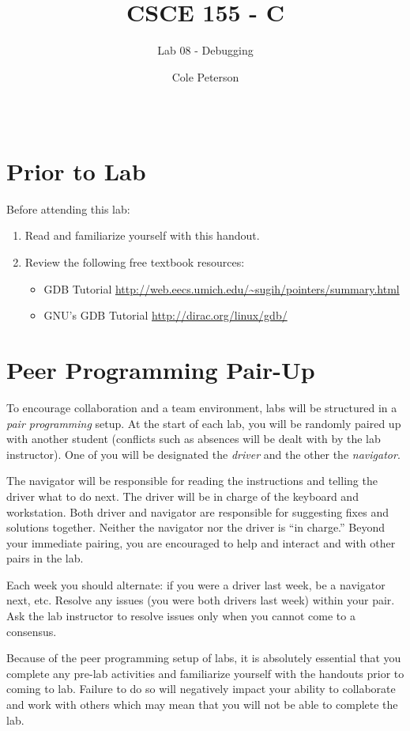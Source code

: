 \documentclass[12pt]{scrartcl}
\title{CSCE 155 - C}
\subtitle{Lab 08 - Debugging}
\author{Cole Peterson}
\date{~}
\begin{document}
\maketitle

\section*{Prior to Lab}

Before attending this lab:
\begin{enumerate}
  \item Read and familiarize yourself with this handout.
  \item Review the following free textbook resources:
	\begin{itemize}
  	  \item GDB Tutorial \url{http://web.eecs.umich.edu/~sugih/pointers/summary.html} 
	  \item GNU's GDB Tutorial \url{http://dirac.org/linux/gdb/}
	\end{itemize}
\end{enumerate}

\section*{Peer Programming Pair-Up}

To encourage collaboration and a team environment, labs will be
structured in a \emph{pair programming} setup.  At the start of
each lab, you will be randomly paired up with another student 
(conflicts such as absences will be dealt with by the lab instructor).
One of you will be designated the \emph{driver} and the other
the \emph{navigator}.  

The navigator will be responsible for reading the instructions and
telling the driver what to do next.  The driver will be in charge of the
keyboard and workstation.  Both driver and navigator are responsible
for suggesting fixes and solutions together.  Neither the navigator
nor the driver is ``in charge.''  Beyond your immediate pairing, you
are encouraged to help and interact and with other pairs in the lab.

Each week you should alternate: if you were a driver last week, 
be a navigator next, etc.  Resolve any issues (you were both drivers
last week) within your pair.  Ask the lab instructor to resolve issues
only when you cannot come to a consensus.  

Because of the peer programming setup of labs, it is absolutely 
essential that you complete any pre-lab activities and familiarize
yourself with the handouts prior to coming to lab.  Failure to do
so will negatively impact your ability to collaborate and work with 
others which may mean that you will not be able to complete the
lab.  
\end{document}
